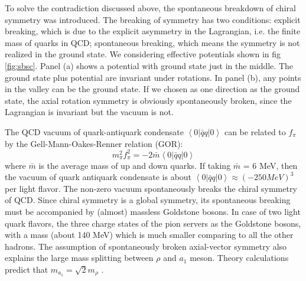 To solve the contradiction discussed above, the spontaneous breakdown
of chiral symmetry was introduced. The breaking of symmetry has two
conditions: explicit breaking, which is due to the explicit asymmetry
in the Lagrangian, i.e. the finite mass of quarks in QCD; spontaneous
breaking, which means the symmetry is not realized in the ground state.
We considering effective potentials shown in fig \ref{fig:sbsc}.
Panel (a) shows a potential with ground state just in the middle.
The ground state plus potential are invariant under rotations. In
panel (b), any points in the valley can be the ground state. If we
chosen as one direction as the ground state, the axial rotation symmetry
is obviously spontaneously broken, since the Lagrangian is invariant
but the vacuum is not. 

The QCD vacuum of quark-antiquark condensate $\left\langle 0\left|\bar{q}q\right|0\right\rangle $
can be related to $f_{\pi}$ by the Gell-Mann-Oakes-Renner relation
(GOR):
\begin{equation}
m_{\pi}^{2}f_{\pi}^{2}=-2\bar{m}\left\langle 0\left|\bar{q}q\right|0\right\rangle 
\end{equation}
where $\bar{m}$ is the average mass of up and down quarks. If taking
$\bar{m}$ = 6 MeV, then the vacuum of quark antiquark condensate
is about $\left\langle 0\left|\bar{q}q\right|0\right\rangle \approx(-250MeV)^{3}$
per light flavor. The non-zero vacuum spontaneously breaks the chiral
symmetry of QCD. Since chiral symmetry is a global symmetry, its spontaneous
breaking must be accompanied by (almost) massless Goldstone bosons.
In case of two light quark flavors, the three charge states of the
pion servers as the Goldstone bosons, with a mass (about 140 MeV)
which is much smaller comparing to all the other hadrons. The assumption
of spontaneously broken axial-vector symmetry also explains the large
mass splitting between $\rho$ and $a_{1}$ meson. Theory calculations
predict that $m_{a_{1}}=\sqrt{2}m_{\rho}$ \cite{PhysRevLett.18.507}.

